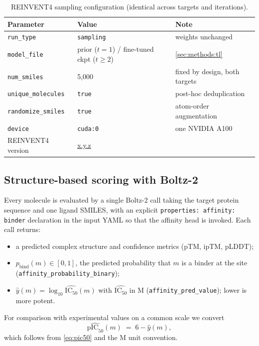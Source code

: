 \documentclass[11pt]{article}
\newcommand{\FILL}[1]{\textcolor{blue!65!black}{\underline{\textsf{#1}}}}
\newcommand{\pbind}{p_{\mathrm{bind}}}          %
\newcommand{\yhat}{\hat{y}}                     %
\newcommand{\ICfifty}{\mathrm{IC}_{50}}
\newcommand{\pICfifty}{\mathrm{pIC}_{50}}
\begin{document}
\begin{table}[h]
\centering
\caption{REINVENT4 sampling configuration (identical across targets and iterations).}
\label{tab:genconfig}
\small
\begin{tabular}{lll}
\toprule
Parameter & Value & Note \\
\midrule
\texttt{run\_type}          & \texttt{sampling} & weights unchanged \\
\texttt{model\_file}        & prior ($t=1$) / fine-tuned ckpt ($t\ge2$) & \cref{sec:methods:tl} \\
\texttt{num\_smiles}        & 5{,}000 & fixed by design, both targets \\
\texttt{unique\_molecules}  & \texttt{true} & post-hoc deduplication \\
\texttt{randomize\_smiles}  & \texttt{true} & atom-order augmentation \\
\texttt{device}             & \texttt{cuda:0} & one NVIDIA A100 \\
REINVENT4 version           & \FILL{x.y.z} & \\
\bottomrule
\end{tabular}
\end{table}

\subsection{Structure-based scoring with Boltz-2}
\label{sec:methods:boltz}

Every molecule is evaluated by a single Boltz-2 \citep{boltz2} call taking the
target protein sequence and one ligand SMILES, with an explicit
\texttt{properties: affinity: binder} declaration in the input YAML so that the
affinity head is invoked. Each call returns:
\begin{itemize}\itemsep0pt
  \item a predicted complex structure and confidence metrics
        (pTM, ipTM, pLDDT);
  \item $\pbind(m) \in [0,1]$, the predicted probability that $m$ is a binder
        at the site (\texttt{affinity\_probability\_binary});
  \item $\yhat(m) = \log_{10}\widehat{\ICfifty}(m)$ with
        $\widehat{\ICfifty}$ in \textmu M
        (\texttt{affinity\_pred\_value}); lower is more potent.
\end{itemize}
For comparison with experimental values on a common scale we convert
\begin{equation}
  \widehat{\pICfifty}(m) \;=\; 6 - \yhat(m),
  \label{eq:convert}
\end{equation}
which follows from \cref{eq:pic50} and the \textmu M unit convention.
\end{document}
